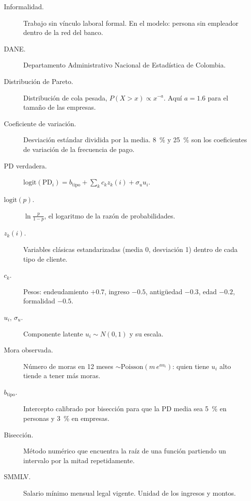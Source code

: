 \begin{terminos}
\begin{description}
\item[Informalidad.] Trabajo sin vínculo laboral formal. En el modelo: persona sin
empleador dentro de la red del banco.
\item[DANE.] Departamento Administrativo Nacional de Estadística de Colombia.
\item[Distribución de Pareto.] Distribución de cola pesada, $P(X>x)\propto x^{-a}$. Aquí
$a=1.6$ para el tamaño de las empresas.
\item[Coeficiente de variación.] Desviación estándar dividida por la media. 8~\% y
25~\% son los coeficientes de variación de la frecuencia de pago.
\item[PD verdadera.] $\mathrm{logit}(\mathrm{PD}_i)=b_\text{tipo}+\sum_kc_kz_k(i)+
\sigma_uu_i$.
\item[$\mathrm{logit}(p)$.] $\ln\frac{p}{1-p}$, el logaritmo de la razón de
probabilidades.
\item[$z_k(i)$.] Variables clásicas estandarizadas (media 0, desviación 1) dentro de cada
tipo de cliente.
\item[$c_k$.] Pesos: endeudamiento $+0.7$, ingreso $-0.5$, antigüedad $-0.3$, edad
$-0.2$, formalidad $-0.5$.
\item[$u_i$, $\sigma_u$.] Componente latente $u_i\sim N(0,1)$ y su escala.
\item[Mora observada.] Número de moras en 12 meses $\sim\mathrm{Poisson}(m\,e^{au_i})$:
quien tiene $u_i$ alto tiende a tener más moras.
\item[$b_\text{tipo}$.] Intercepto calibrado por bisección para que la PD media sea 5~\%
en personas y 3~\% en empresas.
\item[Bisección.] Método numérico que encuentra la raíz de una función partiendo un
intervalo por la mitad repetidamente.
\item[SMMLV.] Salario mínimo mensual legal vigente. Unidad de los ingresos y montos.
\end{description}
\end{terminos}

